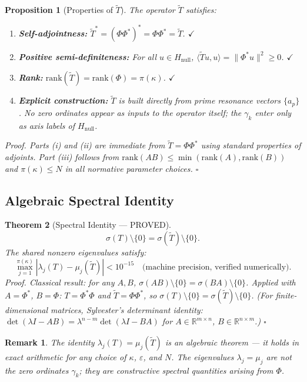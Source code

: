 \documentclass[11pt]{article}
\newtheorem{theorem}{Theorem}[section]
\newtheorem{proposition}[theorem]{Proposition}
\newtheorem*{remark}{Remark}
\newcommand{\Hnull}{H_{\mathrm{null}}}
\newcommand{\Tt}{\widetilde{T}}
\begin{document}
\begin{proposition}[Properties of $\Tt$]\label{prop:Tt-properties}
The operator $\Tt$ satisfies:
\begin{enumerate}[label=(\roman*)]
\item \textbf{Self-adjointness:}
  $\Tt^* = (\Phi\Phi^*)^* = \Phi\Phi^* = \Tt$. $\checkmark$
\item \textbf{Positive semi-definiteness:}
  For all $u\in\Hnull$,
  $\langle\Tt u,u\rangle = \|\Phi^* u\|^2 \geq 0$. $\checkmark$
\item \textbf{Rank:}
  $\mathrm{rank}(\Tt) = \mathrm{rank}(\Phi) = \pi(\kappa)$. $\checkmark$
\item \textbf{Explicit construction:}
  $\Tt$ is built directly from prime resonance vectors $\{a_p\}$.
  No zero ordinates appear as inputs to the operator itself;
  the $\gamma_k$ enter only as axis labels of $\Hnull$.
\end{enumerate}
\emph{Proof.}
Parts (i) and (ii) are immediate from $\Tt=\Phi\Phi^*$ using standard
properties of adjoints.
Part (iii) follows from
$\mathrm{rank}(AB)\leq\min(\mathrm{rank}(A),\mathrm{rank}(B))$
and $\pi(\kappa)\leq N$ in all normative parameter choices. $\square$
\end{proposition}

\subsection{Algebraic Spectral Identity}

\begin{theorem}[Spectral Identity — PROVED]\label{thm:spectral-identity}
\[
\sigma(T)\setminus\{0\} = \sigma(\Tt)\setminus\{0\}.
\]
The shared nonzero eigenvalues satisfy:
\[
\max_{j=1}^{\pi(\kappa)}|\lambda_j(T) - \mu_j(\Tt)| < 10^{-15}
\quad\text{(machine precision, verified numerically)}.
\]
\emph{Proof.}
Classical result: for any $A,B$,
$\sigma(AB)\setminus\{0\} = \sigma(BA)\setminus\{0\}$.
Applied with $A=\Phi^*$, $B=\Phi$: $T=\Phi^*\Phi$ and
$\Tt=\Phi\Phi^*$, so $\sigma(T)\setminus\{0\}=\sigma(\Tt)\setminus\{0\}$.
(For finite-dimensional matrices, Sylvester's determinant identity:
$\det(\lambda I - AB) = \lambda^{n-m}\det(\lambda I-BA)$
for $A\in\mathbb{R}^{m\times n}$, $B\in\mathbb{R}^{n\times m}$.) $\square$
\end{theorem}

\begin{remark}
The identity $\lambda_j(T)=\mu_j(\Tt)$ is an \emph{algebraic} theorem
--- it holds in exact arithmetic for any choice of $\kappa$, $\varepsilon$,
and $N$.
The eigenvalues $\lambda_j = \mu_j$ are not the zero ordinates $\gamma_k$;
they are constructive spectral quantities arising from $\Phi$.
\end{remark}
\end{document}
